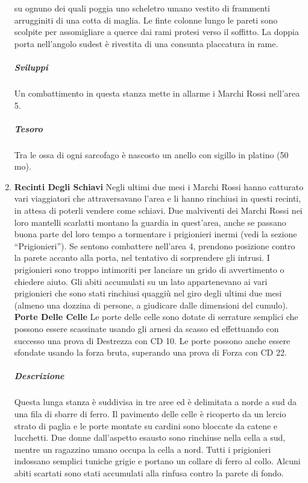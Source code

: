 \documentclass{article}
\begin{document}
\begin{enumerate}
su ognuno dei quali poggia uno scheletro umano vestito di
frammenti arrugginiti di una cotta di maglia. Le finte colonne
lungo le pareti sono scolpite per assomigliare a querce dai
rami protesi verso il soffitto. La doppia porta nell’angolo
sudest è rivestita di una consunta placcatura in rame.
\subparagraph{Sviluppi}Un combattimento in questa stanza mette in allarme i Marchi
Rossi nell’area 5.
\subparagraph{Tesoro}Tra le ossa di ogni sarcofago è nascosto un anello con sigillo
in platino (50 mo).
\item \textbf{Recinti Degli Schiavi} Negli ultimi due mesi i Marchi Rossi hanno catturato vari
viaggiatori che attraversavano l’area e li hanno rinchiusi in
questi recinti, in attesa di poterli vendere come schiavi. Due malviventi dei Marchi Rossi nei loro mantelli scarlatti
montano la guardia in quest'area, anche se passano buona
parte del loro tempo a tormentare i prigionieri inermi (vedi
la sezione “Prigionieri”). Se sentono combattere nell’area
4, prendono posizione contro la parete accanto alla porta,
nel tentativo di sorprendere gli intrusi. I prigionieri sono
troppo intimoriti per lanciare un grido di avvertimento o
chiedere aiuto. Gli abiti accumulati su un lato appartenevano ai vari
prigionieri che sono stati rinchiusi quaggiù nel giro degli
ultimi due mesi (almeno una dozzina di persone, a giudicare
dalle dimensioni del cumulo).\newline
\textbf{Porte Delle Celle} Le porte delle celle sono dotate di
serrature semplici che possono essere scassinate usando gli
arnesi da scasso ed effettuando con successo una prova di
Destrezza con CD 10. Le porte possono anche essere sfondate
usando la forza bruta, superando una prova di Forza con CD 22.

\subparagraph{Descrizione}Questa lunga stanza è suddivisa in tre aree ed è delimitata
a norde a sud da una fila di sbarre di ferro. Il pavimento
delle celle è ricoperto da un lercio strato di paglia e le porte
montate su cardini sono bloccate da catene e lucchetti. Due
donne dall’aspetto esausto sono rinchiuse nella cella a sud,
mentre un ragazzino umano occupa la cella a nord. Tutti i
prigionieri indossano semplici tuniche grigie e portano un
collare di ferro al collo.
Alcuni abiti scartati sono stati accumulati alla rinfusa contro la
parete di fondo.


\end{enumerate}
\end{document}
